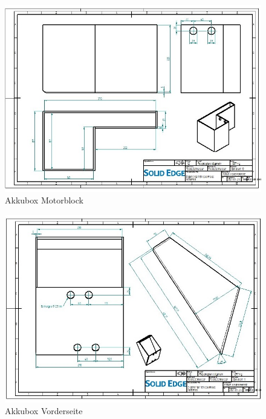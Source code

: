 \begin{figure} [H]
	\begin{center}
		\includegraphics[angle=90]{figures/mechanik/Box_Zeichnung.jpg}
			\caption{Akkubox Motorblock}
			\label{fig:Akkubox Motorblock}
	\end{center}
\end{figure}


\begin{figure} [H]
	\begin{center}
		\includegraphics[angle=90]{figures/mechanik/Box_2_Zeichnung.jpg}
			\caption{Akkubox Vorderseite}
			\label{fig:Akkubox Vorderseite}
	\end{center}
\end{figure}


